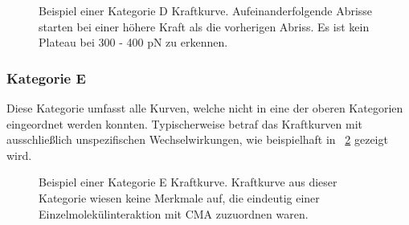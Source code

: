 \begin{figure}[H]
	\centering
	\caption[Beispiel einer Kategorie D Kraftkurve]{Beispiel einer Kategorie D Kraftkurve. Aufeinanderfolgende Abrisse starten bei einer höhere Kraft als die vorherigen Abriss. Es ist kein Plateau bei 300 - 400 pN zu erkennen.}
	\label{fig:kategorie_d_kurve}
\end{figure}

\subsubsection{Kategorie E}
\label{subsubsec:kategorie_e}

Diese Kategorie umfasst alle Kurven, welche nicht in eine der oberen Kategorien eingeordnet werden konnten. Typischerweise betraf das Kraftkurven mit ausschließlich unspezifischen Wechselwirkungen, wie beispielhaft in \abb~\ref{fig:kategorie_e_kurve} gezeigt wird.

\begin{figure}[H]
	\centering
	\caption[Beispiel einer Kategorie E Kraftkurve]{Beispiel einer Kategorie E Kraftkurve. Kraftkurve aus dieser Kategorie wiesen keine Merkmale auf, die eindeutig einer Einzelmolekülinteraktion mit \acs*{CMA} zuzuordnen waren.}
	\label{fig:kategorie_e_kurve}
\end{figure}

